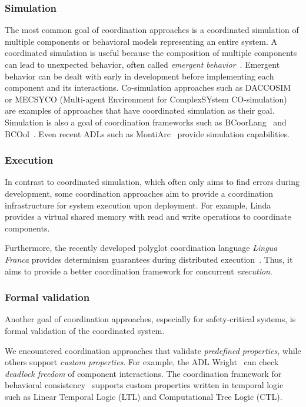 \documentclass[runningheads]{llncs}
\begin{document}
\subsubsection{Simulation} The most common goal of coordination approaches is a coordinated simulation of multiple components or behavioral models representing an entire system.
A coordinated simulation is useful because the composition of multiple components can lead to unexpected behavior, often called \textit{emergent behavior}~\cite{ekerTamingHeterogeneityPtolemy2003}.
Emergent behavior can be dealt with early in development before implementing each component and its interactions.
Co-simulation approaches such as DACCOSIM~\cite{galtierFMIBasedDistributedMultisimulation2015,dadSynthesisFeedbackDistribution2021} or MECSYCO (Multi-agent Environment for ComplexSYstem CO-simulation)~\cite{camusHybridCosimulationFMUs2016,camusCosimulationCyberphysicalSystems2018} are examples of approaches that have coordinated simulation as their goal.
Simulation is also a goal of coordination frameworks such as BCoorLang~\cite{krauterBehavioralConsistencyMultimodeling2023} and BCOol~\cite{varalarsenBehavioralCoordinationOperator2015}.
Even recent ADLs such as MontiArc~\cite{haberMontiArcArchitecturalModeling2014} provide simulation capabilities.

\subsubsection{Execution} In contrast to coordinated simulation, which often only aims to find errors during development, some coordination approaches aim to provide a coordination infrastructure for system execution upon deployment.
For example, Linda provides a virtual shared memory with read and write operations to coordinate components.

Furthermore, the recently developed polyglot coordination language \textit{Lingua Franca} provides determinism guarantees during distributed execution~\cite{lohstrohLinguaFrancaDeterministic2021}.
Thus, it aims to provide a better coordination framework for concurrent \textit{execution}.


\subsubsection{Formal validation} Another goal of coordination approaches, especially for safety-critical systems, is formal validation of the coordinated system.

We encountered coordination approaches that validate \textit{predefined properties}, while others support \textit{custom properties}.
For example, the ADL Wright~\cite{allenFormalBasisArchitectural1997} can check \textit{deadlock freedom} of component interactions.
The coordination framework for behavioral consistency~\cite{krauterBehavioralConsistencyMultimodeling2023} supports custom properties written in temporal logic such as Linear Temporal Logic (LTL) and Computational Tree Logic (CTL).
\end{document}
